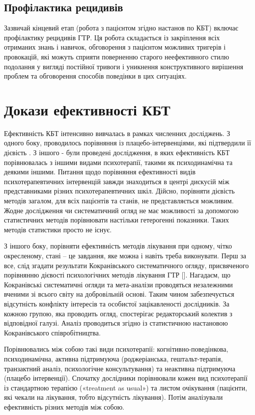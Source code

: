 \documentclass[twocolumn]{article}
\begin{document}
\subsection {Профілактика рецидивів}
\par Зазвичай кінцевий етап (робота з пацієнтом згідно настанов по КБТ) включає профілактику рецидивів ГТР. Ця робота складається із закріплення всіх отриманих знань і навичок, обговорення з пацієнтом можливих тригерів і провокацій, які можуть сприяти поверненню старого неефективного стилю подолання у вигляді постійної тривоги і уникнення конструктивного вирішення проблем та обговорення способів поведінки в цих ситуаціях.
\section {Докази ефективності КБТ}
\par Ефективність КБТ інтенсивно вивчалась в рамках численних досліджень. З одного боку, проводилось порівняння із плацебо-інтервенціями, які підтвердили її дієвість . З іншого - були проведені дослідження, в яких ефективність КБТ порівнювалась з іншими видами психотерапії, такими як психодинамічна та деякими іншими. Питання щодо порівняння ефективності  видів психотерапевтичних інтервенцій завжди знаходиться в центрі дискусій між представниками різних психотерапевтичних шкіл. Дійсно, порівняти дієвість методів загалом, для всіх пацієнтів та станів, не представляється можливим. Жодне дослідження чи систематичний огляд не має можливості за допомогою статистичних методів порівнювати настільки гетерогенні показники. Таких методів статистики просто не існує.
\par З іншого боку, порівняти ефективність методів лікування при одному, чітко окресленому, стані – це завдання, яке можна і навіть треба виконувати. Перш за все, слід згадати результати Кокранівського систематичного огляду, присвяченого порівнянню дієвості психологічних методів лікування ГТР [\cite{bib15}]. Нагадаєм, що Кокранівські систематичні огляди та мета-аналізи проводяться незалежними вченими зі всього світу на добровільній основі. Таким чином забезпечується відсутність конфлікту інтересів та особистої зацікавленості дослідників. За кожною групою, яка проводить огляд, спостерігає редакторський колектив з відповідної галузі. Аналіз проводиться згідно із статистичною настановою Кокранівського співробітництва.
\par Порівнювались між собою такі види психотерапії: когнітивно-поведінкова, психодинамічна, активна підтримуюча (роджеріанська, гештальт-терапія, транзактний аналіз, психологічне консультування) та неактивна підтримуюча (плацебо інтервенції). Спочатку дослідники порівнювали кожен вид психотерапії із стандартною терапією («treatment as usual») та листом очікування (пацієнти, які чекали на лікування, тобто відсутність лікування). Потім аналізували ефективність різних методів між собою.
\end{document}
